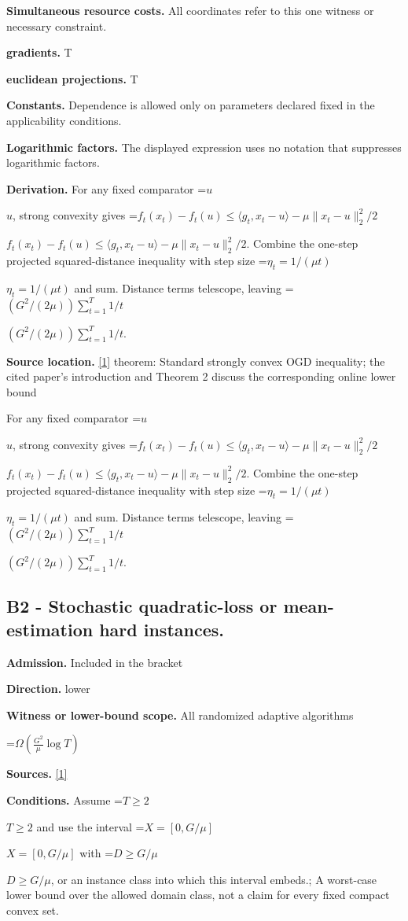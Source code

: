 \documentclass[10pt,a4paper]{article}
\newcommand{\AtlasMath}[1]{\par\begingroup\centering\setbox0=\hbox{$\displaystyle #1$}\ifdim\wd0>1.4\linewidth\typeout{ATLAS WIDE FORMULA: \the\wd0}\fi\ifdim\wd0>\linewidth\resizebox{\linewidth}{!}{\box0}\else\box0\fi\par\endgroup}
\newcommand{\AtlasInlineMath}[1]{\begingroup\setbox0=\hbox{$#1$}\ifdim\wd0>.4\linewidth\endgroup\AtlasMath{#1}\else\endgroup$#1$\fi}
\begin{document}
\textbf{Simultaneous resource costs.} All coordinates refer to this one witness or necessary constraint.

\textbf{gradients.} T

\textbf{euclidean projections.} T

\textbf{Constants.} Dependence is allowed only on parameters declared fixed in the applicability conditions.

\textbf{Logarithmic factors.} The displayed expression uses no notation that suppresses logarithmic factors.

\textbf{Derivation.} For any fixed comparator \AtlasInlineMath{u}, strong convexity gives \AtlasInlineMath{f_t(x_t)-f_t(u)\le\langle g_t,x_t-u\rangle-\mu\|x_t-u\|_2^2/2}. Combine the one-step projected squared-distance inequality with step size \AtlasInlineMath{\eta_t=1/(\mu t)} and sum. Distance terms telescope, leaving \AtlasInlineMath{(G^2/(2\mu))\sum_{t=1}^T1/t}.

\textbf{Source location.} \href{https://jmlr.org/papers/v15/hazan14a.html}{[1]} theorem: Standard strongly convex OGD inequality; the cited paper's introduction and Theorem 2 discuss the corresponding online lower bound

For any fixed comparator \AtlasInlineMath{u}, strong convexity gives \AtlasInlineMath{f_t(x_t)-f_t(u)\le\langle g_t,x_t-u\rangle-\mu\|x_t-u\|_2^2/2}. Combine the one-step projected squared-distance inequality with step size \AtlasInlineMath{\eta_t=1/(\mu t)} and sum. Distance terms telescope, leaving \AtlasInlineMath{(G^2/(2\mu))\sum_{t=1}^T1/t}.

\subsection{B2 - Stochastic quadratic-loss or mean-estimation hard instances.}
\textbf{Admission.} Included in the bracket

\textbf{Direction.} lower

\textbf{Witness or lower-bound scope.} All randomized adaptive algorithms

\AtlasMath{\Omega\!\left(\frac{G^2}{\mu}\log T\right)}
\textbf{Sources.} \href{https://jmlr.org/papers/v15/hazan14a.html}{[1]}

\textbf{Conditions.} Assume \AtlasInlineMath{T\ge2} and use the interval \AtlasInlineMath{X=[0,G/\mu]} with \AtlasInlineMath{D\ge G/\mu}, or an instance class into which this interval embeds.; A worst-case lower bound over the allowed domain class, not a claim for every fixed compact convex set.
\end{document}
